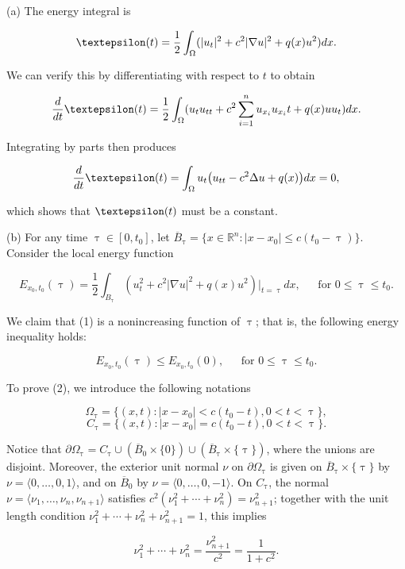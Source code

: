 \documentclass{article}
\begin{document}
(a) The energy integral is

$$\textepsilon(t)=\frac{1}{2}\int_{\Omega}(|u_t|^2+c^2|\nabla u|^2+q(x)u^2) dx.$$

We can verify this by differentiating with respect to $t$ to obtain

$$\frac{d}{dt}\textepsilon(t)=\frac{1}{2}\int_{\Omega}(u_tu_{tt}+c^2\sum_{i=1}^n u_{x_i}u_{x_i}t + q(x)uu_t) dx.$$

Integrating by parts then produces

$$\frac{d}{dt}\textepsilon(t)=\int_{\Omega}u_t\big(u_{tt}-c^2\Delta u +q(x)\big)dx=0,$$

which shows that $\textepsilon(t)$ must be a constant.

(b) For any time $\uptau\in[0,t_0]$, let $\overline{B}_{\uptau}=\{x\in\mathbb R^n:|x-x_0|\leq c(t_0-\uptau)\}$. Consider the local energy function

\begin{equation}
E_{x_0,t_0}(\uptau)=\frac{1}{2}\int_{B_{\uptau}}(u_t^2+c^2|\nabla u|^2+q(x)u^2)\big|_{t=\uptau}dx, ~~~~~~~\text{for $0\leq \uptau\leq t_0$}.
\end{equation}

We claim that (1) is a nonincreasing function of $\uptau$; that is, the following energy inequality holds:

\begin{equation}
E_{x_0,t_0}(\uptau)\leq E_{x_0,t_0}(0), ~~~~~~~\text{for $0\leq \uptau\leq t_0$}.
\end{equation}

To prove (2), we introduce the following notations

$$\Omega_{\uptau}=\{(x,t):|x-x_0|< c(t_0-t),0<t<\uptau\},$$
$$C_{\uptau}=\{(x,t):|x-x_0|= c(t_0-t),0<t<\uptau\}.$$

Notice that $\partial\Omega_{\uptau}=C_{\uptau}\cup(\overline{B}_0\times\{0\})\cup(\overline{B}_{\uptau}\times\{\uptau\})$, where the unions are disjoint. Moreover, the exterior unit normal $\nu$ on $\partial\Omega_{\uptau}$ is given on $\overline{B}_{\uptau}\times\{\uptau\}$ by $\nu=\langle 0,\dots,0,1 \rangle$, and on $\overline{B}_0$ by $\nu=\langle 0,\dots,0,-1 \rangle$. On $C_{\uptau}$, the normal $\nu=\langle \nu_1,\dots,\nu_n,\nu_{n+1} \rangle$ satisfies $c^2(\nu_1^2 + \cdots + \nu_n^2)=\nu_{n+1}^2$; together with the unit length condition $\nu_1^2 + \cdots + \nu_n^2 + \nu_{n+1}^2=1$, this implies

$$\nu_1^2 + \cdots + \nu_n^2=\frac{\nu_{n+1}^2}{c^2}=\frac{1}{1+c^2}.$$
\end{document}
